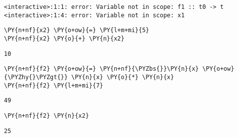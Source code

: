     \begin{Verbatim}[commandchars=\\\{\}, frame=single, framerule=1mm, rulecolor=\color{outerrorbackground}]
<interactive>:1:1: error: Variable not in scope: f1 :: t0 -> t
<interactive>:1:4: error: Variable not in scope: x1
    \end{Verbatim}

    \begin{tcolorbox}[breakable, size=fbox, boxrule=1pt, pad at break*=1mm,colback=cellbackground, colframe=cellborder, top=.75ex]
\begin{Verbatim}[commandchars=\\\{\}]
\PY{n+nf}{x2} \PY{o+ow}{=} \PY{l+m+mi}{5}
\PY{n+nf}{x2} \PY{o}{+} \PY{n}{x2}
\end{Verbatim}
\end{tcolorbox}

    
    \begin{Verbatim}[commandchars=\\\{\}]
10
    \end{Verbatim}

    
    \begin{tcolorbox}[breakable, size=fbox, boxrule=1pt, pad at break*=1mm,colback=cellbackground, colframe=cellborder, top=.75ex]
\begin{Verbatim}[commandchars=\\\{\}]
\PY{n+nf}{f2} \PY{o+ow}{=} \PY{n+nf}{\PYZbs{}}\PY{n}{x} \PY{o+ow}{\PYZhy{}\PYZgt{}} \PY{n}{x} \PY{o}{*} \PY{n}{x}
\PY{n+nf}{f2} \PY{l+m+mi}{7}
\end{Verbatim}
\end{tcolorbox}

    
    \begin{Verbatim}[commandchars=\\\{\}]
49
    \end{Verbatim}

    
    \begin{tcolorbox}[breakable, size=fbox, boxrule=1pt, pad at break*=1mm,colback=cellbackground, colframe=cellborder, top=.75ex]
\begin{Verbatim}[commandchars=\\\{\}]
\PY{n+nf}{f2} \PY{n}{x2}
\end{Verbatim}
\end{tcolorbox}

    
    \begin{Verbatim}[commandchars=\\\{\}]
25
    \end{Verbatim}

